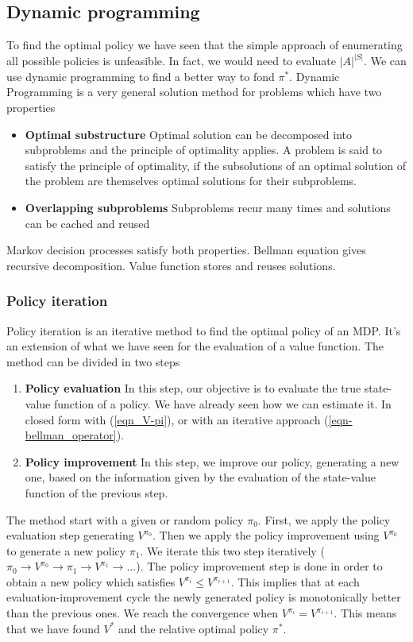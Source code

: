 \documentclass[../main.tex]{subfiles}
\begin{document}
\subsection{Dynamic programming}
To find the optimal policy we have seen that the simple approach of enumerating all possible policies is unfeasible. In fact, we would need to evaluate $|A|^{|S|}$. We can use dynamic programming to find a better way to fond $\pi^*$. Dynamic Programming is a very general solution method for problems
which have two properties
\begin{itemize}
    \item \textbf{Optimal substructure} Optimal solution can be decomposed into subproblems and the principle of optimality applies. A problem is said to satisfy the principle of optimality, if the subsolutions of an optimal solution of the problem are themselves optimal solutions for their subproblems.
    \item \textbf{Overlapping subproblems} Subproblems recur many times and solutions can be cached and reused
\end{itemize}
Markov decision processes satisfy both properties. Bellman equation gives recursive decomposition. Value function stores and reuses solutions.

\subsubsection{Policy iteration}
Policy iteration is an iterative method to find the optimal policy of an MDP. It's an extension of what we have seen for the evaluation of a value function. The method can be divided in two steps
\begin{enumerate}
    \item \textbf{Policy evaluation} In this step, our objective is to evaluate the true state-value function of a policy. We have already seen how we can estimate it. In closed form with (\ref{eqn_V-pi}), or with an iterative approach (\ref{eqn-bellman_operator}).
    \item \textbf{Policy improvement} In this step, we improve our policy, generating a new one, based on the information given by the evaluation of the state-value function of the previous step.
\end{enumerate}
The method start with a given or random policy $\pi_0$. First, we apply the policy evaluation step generating $V^{\pi_0}$. Then we apply the policy improvement using $V^{\pi_0}$ to generate a new policy $\pi_1$. We iterate this two step iteratively ($\pi_0 \rightarrow V^{\pi_0} \rightarrow \pi_1 \rightarrow V^{\pi_1} \rightarrow \dots $). The policy improvement step is done in order to obtain a new policy which satisfies $V^{\pi_i} \leq V^{\pi_{i+1}}$. This implies that at each evaluation-improvement cycle the newly generated policy is monotonically better than the previous ones. We reach the convergence when $V^{\pi_i} = V^{\pi_{i+1}}$. This means that we have found $V^*$ and the relative optimal policy $\pi^*$.
\end{document}
